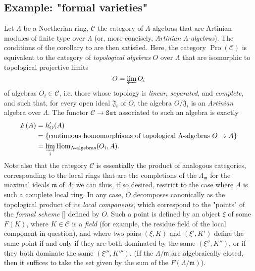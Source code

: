 \subsection{Example: "formal varieties"}\label{fga3.ii-a.5}

Let $\Lambda$ be a Noetherian ring, $\mathcal{C}$ the category of $\Lambda$-algebras that are Artinian modules of finite type over $\Lambda$ (or, more concisely, \emph{Artinian $\Lambda$-algebras}).
The conditions of the corollary to
 are then satisfied.
Here, the category $\operatorname{Pro}(\mathcal{C})$ is equivalent to the category of \emph{topological algebras} $O$ over $\Lambda$ that are isomorphic to topological projective limits
\[
    O = \varprojlim O_i
\]
of algebras $O_i\in\mathcal{C}$, i.e. those whose topology is \emph{linear}, \emph{separated}, and \emph{complete}, and such that, for every open ideal $\mathfrak{J}_i$ of $O$, the algebra $O/\mathfrak{J}_i$ is an \emph{Artinian} algebra over $\Lambda$.
The functor $\mathcal{C}\to\mathtt{Set}$ associated to such an algebra is exactly
\[
    \begin{aligned}
        F(A)
         & = h'_{O}(A)
        \\&= \{\text{continuous homomorphisms of topological }\Lambda\text{-algebras }O\to A\}
        \\&= \varinjlim_i \operatorname{Hom}_{\Lambda\text{-algebras}}(O_i,A).
    \end{aligned}
\]
Note also that the category $\mathcal{C}$ is essentially the product of analogous categories, corresponding to the local rings that are the completions of the $\Lambda_{\mathfrak{m}}$ for the maximal ideals $\mathfrak{m}$ of $\Lambda$;
we can thus, if so desired, restrict to the case where $A$ is such a complete local ring.
In any case, $O$ decomposes canonically as the topological product of its \emph{local components}, which correspond to the "points" of the \emph{formal scheme} [] defined by $O$.
Such a point is defined by an object $\xi$ of some $F(K)$, where $K\in\mathcal{C}$ is a \emph{field} (for example, the residue field of the local component in question), and where two pairs $(\xi,K)$ and $(\xi',K')$ define the same point if and only if they are both dominated by the same $(\xi'',K'')$, or if they both dominate the same $(\xi''',K''')$.
(If the ${\Lambda}/\mathfrak{m}$ are algebraically closed, then it suffices to take the set given by the sum of the $F({\Lambda}/\mathfrak{m})$).

